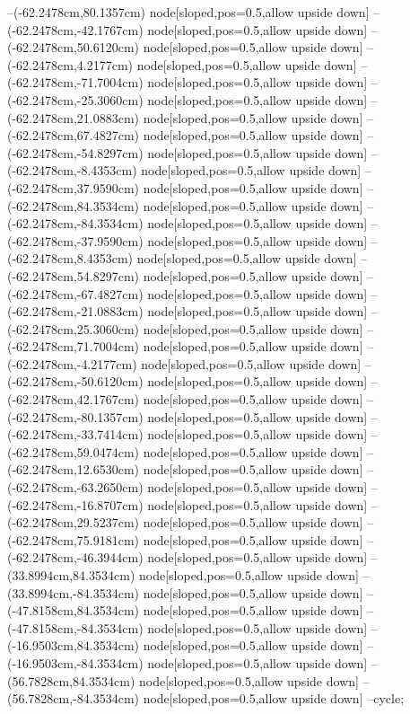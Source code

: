 --(-62.2478cm,80.1357cm) node[sloped,pos=0.5,allow upside down]{\ArrowIn}
--(-62.2478cm,-42.1767cm) node[sloped,pos=0.5,allow upside down]{\ArrowIn}
--(-62.2478cm,50.6120cm) node[sloped,pos=0.5,allow upside down]{\ArrowIn}
--(-62.2478cm,4.2177cm) node[sloped,pos=0.5,allow upside down]{\ArrowIn}
--(-62.2478cm,-71.7004cm) node[sloped,pos=0.5,allow upside down]{\ArrowIn}
--(-62.2478cm,-25.3060cm) node[sloped,pos=0.5,allow upside down]{\ArrowIn}
--(-62.2478cm,21.0883cm) node[sloped,pos=0.5,allow upside down]{\ArrowIn}
--(-62.2478cm,67.4827cm) node[sloped,pos=0.5,allow upside down]{\ArrowIn}
--(-62.2478cm,-54.8297cm) node[sloped,pos=0.5,allow upside down]{\ArrowIn}
--(-62.2478cm,-8.4353cm) node[sloped,pos=0.5,allow upside down]{\ArrowIn}
--(-62.2478cm,37.9590cm) node[sloped,pos=0.5,allow upside down]{\ArrowIn}
--(-62.2478cm,84.3534cm) node[sloped,pos=0.5,allow upside down]{\ArrowIn}
--(-62.2478cm,-84.3534cm) node[sloped,pos=0.5,allow upside down]{\ArrowIn}
--(-62.2478cm,-37.9590cm) node[sloped,pos=0.5,allow upside down]{\ArrowIn}
--(-62.2478cm,8.4353cm) node[sloped,pos=0.5,allow upside down]{\ArrowIn}
--(-62.2478cm,54.8297cm) node[sloped,pos=0.5,allow upside down]{\ArrowIn}
--(-62.2478cm,-67.4827cm) node[sloped,pos=0.5,allow upside down]{\ArrowIn}
--(-62.2478cm,-21.0883cm) node[sloped,pos=0.5,allow upside down]{\ArrowIn}
--(-62.2478cm,25.3060cm) node[sloped,pos=0.5,allow upside down]{\ArrowIn}
--(-62.2478cm,71.7004cm) node[sloped,pos=0.5,allow upside down]{\ArrowIn}
--(-62.2478cm,-4.2177cm) node[sloped,pos=0.5,allow upside down]{\ArrowIn}
--(-62.2478cm,-50.6120cm) node[sloped,pos=0.5,allow upside down]{\ArrowIn}
--(-62.2478cm,42.1767cm) node[sloped,pos=0.5,allow upside down]{\ArrowIn}
--(-62.2478cm,-80.1357cm) node[sloped,pos=0.5,allow upside down]{\ArrowIn}
--(-62.2478cm,-33.7414cm) node[sloped,pos=0.5,allow upside down]{\ArrowIn}
--(-62.2478cm,59.0474cm) node[sloped,pos=0.5,allow upside down]{\ArrowIn}
--(-62.2478cm,12.6530cm) node[sloped,pos=0.5,allow upside down]{\ArrowIn}
--(-62.2478cm,-63.2650cm) node[sloped,pos=0.5,allow upside down]{\ArrowIn}
--(-62.2478cm,-16.8707cm) node[sloped,pos=0.5,allow upside down]{\ArrowIn}
--(-62.2478cm,29.5237cm) node[sloped,pos=0.5,allow upside down]{\ArrowIn}
--(-62.2478cm,75.9181cm) node[sloped,pos=0.5,allow upside down]{\ArrowIn}
--(-62.2478cm,-46.3944cm) node[sloped,pos=0.5,allow upside down]{\ArrowIn}
--(33.8994cm,84.3534cm) node[sloped,pos=0.5,allow upside down]{\ArrowIn}
--(33.8994cm,-84.3534cm) node[sloped,pos=0.5,allow upside down]{\ArrowIn}
--(-47.8158cm,84.3534cm) node[sloped,pos=0.5,allow upside down]{\ArrowIn}
--(-47.8158cm,-84.3534cm) node[sloped,pos=0.5,allow upside down]{\ArrowIn}
--(-16.9503cm,84.3534cm) node[sloped,pos=0.5,allow upside down]{\ArrowIn}
--(-16.9503cm,-84.3534cm) node[sloped,pos=0.5,allow upside down]{\ArrowIn}
--(56.7828cm,84.3534cm) node[sloped,pos=0.5,allow upside down]{\ArrowIn}
--(56.7828cm,-84.3534cm) node[sloped,pos=0.5,allow upside down]{\ArrowIn}
--cycle;
